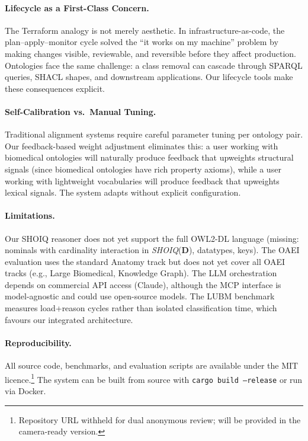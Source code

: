 \documentclass[runningheads]{llncs}
\begin{document}
\paragraph{Lifecycle as a First-Class Concern.}
The Terraform analogy is not merely aesthetic. In infrastructure-as-code, the plan--apply--monitor cycle solved the ``it works on my machine'' problem by making changes visible, reviewable, and reversible before they affect production. Ontologies face the same challenge: a class removal can cascade through SPARQL queries, SHACL shapes, and downstream applications. Our lifecycle tools make these consequences explicit.

\paragraph{Self-Calibration vs.\ Manual Tuning.}
Traditional alignment systems require careful parameter tuning per ontology pair. Our feedback-based weight adjustment eliminates this: a user working with biomedical ontologies will naturally produce feedback that upweights structural signals (since biomedical ontologies have rich property axioms), while a user working with lightweight vocabularies will produce feedback that upweights lexical signals. The system adapts without explicit configuration.

\paragraph{Limitations.}
Our SHOIQ reasoner does not yet support the full OWL2-DL language (missing: nominals with cardinality interaction in \emph{SHOIQ}($\mathbf{D}$), datatypes, keys). The OAEI evaluation uses the standard Anatomy track but does not yet cover all OAEI tracks (e.g., Large Biomedical, Knowledge Graph). The LLM orchestration depends on commercial API access (Claude), although the MCP interface is model-agnostic and could use open-source models. The LUBM benchmark measures load+reason cycles rather than isolated classification time, which favours our integrated architecture.

\paragraph{Reproducibility.}
All source code, benchmarks, and evaluation scripts are available under the MIT licence.\footnote{Repository URL withheld for dual anonymous review; will be provided in the camera-ready version.} The system can be built from source with \texttt{cargo build --release} or run via Docker.
\end{document}
